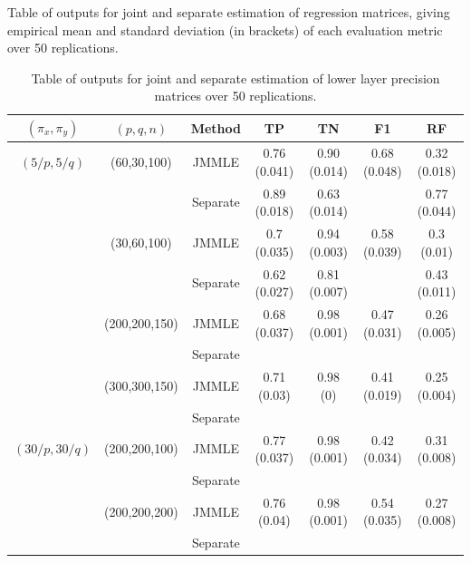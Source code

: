 \begin{scriptsize}
\begin{table}
    \caption{Table of outputs for joint and separate estimation of regression matrices, giving empirical mean and standard deviation (in brackets) of each evaluation metric over 50 replications.}
    \label{table:simtable11}
\end{table}
%
\begin{table}
    \begin{tabular}{ccccccc}
    \hline
    $(\pi_x, \pi_y)$ & $(p,q,n)$   & Method   & TP            & TN             & F1 & RF            \\ \hline
    $(5/p, 5/q)$   & (60,30,100)   & JMMLE    & 0.76 (0.041) & 0.90 (0.014)   & 0.68 (0.048)   & 0.32 (0.018) \\
    ~              & ~             & Separate & 0.89 (0.018) & 0.63 (0.014)  & ~   & 0.77 (0.044) \\
    ~              & (30,60,100)   & JMMLE    & 0.7 (0.035) & 0.94 (0.003)  & 0.58 (0.039)   & 0.3 (0.01) \\
    ~              & ~             & Separate & 0.62 (0.027) & 0.81 (0.007)  & ~   & 0.43 (0.011) \\
    ~              & (200,200,150) & JMMLE    & 0.68 (0.037) & 0.98 (0.001)  & 0.47 (0.031)   & 0.26 (0.005) \\
    ~              & ~             & Separate & ~             & ~              & ~   & ~             \\
    ~              & (300,300,150) & JMMLE    & 0.71 (0.03)  & 0.98 (0)      & 0.41 (0.019)   & 0.25 (0.004) \\
    ~              & ~             & Separate & ~             & ~              & ~   & ~             \\\hline
    $(30/p, 30/q)$ & (200,200,100) & JMMLE    & 0.77 (0.037) & 0.98 (0.001)  & 0.42 (0.034)   & 0.31 (0.008) \\
    ~              & ~             & Separate & ~             & ~              & ~   & ~             \\
    ~              & (200,200,200) & JMMLE    & 0.76 (0.04)  & 0.98 (0.001)  & 0.54 (0.035)   & 0.27 (0.008) \\
    ~              & ~             & Separate & ~             & ~              & ~   & ~             \\ \hline
    \end{tabular}
    \caption{Table of outputs for joint and separate estimation of lower layer precision matrices over 50 replications.}
    \label{table:simtable12}
\end{table}
\end{scriptsize}


